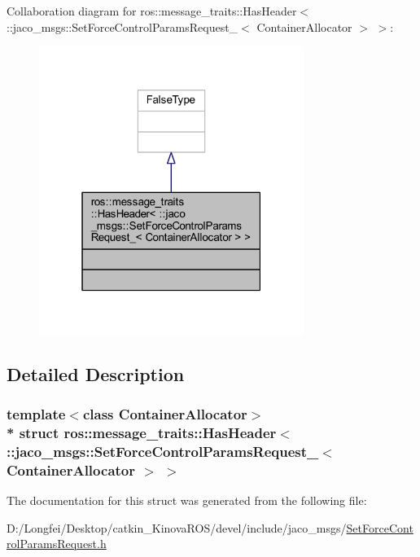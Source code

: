 Collaboration diagram for ros\+:\+:message\+\_\+traits\+:\+:Has\+Header$<$ \+:\+:jaco\+\_\+msgs\+:\+:Set\+Force\+Control\+Params\+Request\+\_\+$<$ Container\+Allocator $>$ $>$\+:
\nopagebreak
\begin{figure}[H]
\begin{center}
\leavevmode
\includegraphics[width=244pt]{de/d2d/structros_1_1message__traits_1_1HasHeader_3_01_1_1jaco__msgs_1_1SetForceControlParamsRequest___3400ced301abd3bb3b4be2b3810e70885}
\end{center}
\end{figure}


\subsection{Detailed Description}
\subsubsection*{template$<$class Container\+Allocator$>$\\*
struct ros\+::message\+\_\+traits\+::\+Has\+Header$<$ \+::jaco\+\_\+msgs\+::\+Set\+Force\+Control\+Params\+Request\+\_\+$<$ Container\+Allocator $>$ $>$}



The documentation for this struct was generated from the following file\+:\begin{DoxyCompactItemize}
\item 
D\+:/\+Longfei/\+Desktop/catkin\+\_\+\+Kinova\+R\+O\+S/devel/include/jaco\+\_\+msgs/\hyperlink{SetForceControlParamsRequest_8h}{Set\+Force\+Control\+Params\+Request.\+h}\end{DoxyCompactItemize}
